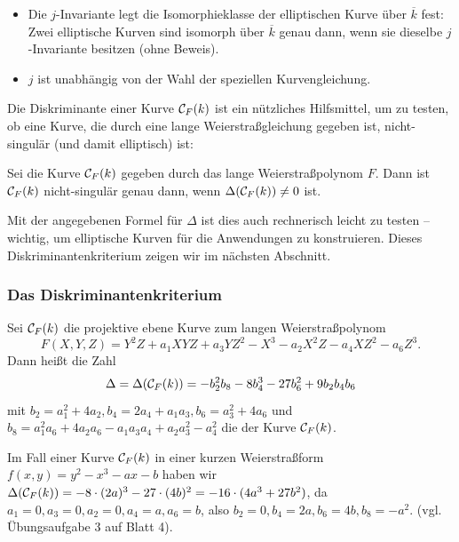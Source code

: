 \begin{bem}
	\begin{itemize}
		\item Die $j$-Invariante legt die Isomorphieklasse der elliptischen Kurve über $\overline{k}$ fest: Zwei elliptische Kurven sind isomorph über $\overline{k}$ genau dann, wenn sie dieselbe $j$-Invariante besitzen (ohne Beweis).
		\item $j$ ist unabhängig von der Wahl der speziellen Kurvengleichung.
	\end{itemize}
\end{bem}

\begin{bem}
	Die Diskriminante einer Kurve $\mathcal{C}_F(k)$ ist ein nützliches Hilfsmittel, um zu testen, ob eine Kurve, die durch eine lange Weierstraßgleichung gegeben ist, nicht-singulär (und damit elliptisch) ist:
\end{bem}

\begin{satz}
	Sei die Kurve $\mathcal{C}_F(k)$ gegeben durch das lange Weierstraßpolynom $F$. 
	Dann ist $\mathcal{C}_F(k)$ nicht-singulär genau dann, wenn $\Delta(\mathcal{C}_F(k)) \neq 0$ ist.
\end{satz}

Mit der angegebenen Formel für $\Delta$ ist dies auch rechnerisch leicht zu testen -- wichtig, um elliptische Kurven für die Anwendungen zu konstruieren. 
Dieses Diskriminantenkriterium zeigen wir im nächsten Abschnitt.
\nextlecture
\subsubsection{Das Diskriminantenkriterium}
\begin{defn}[Diskriminante]
	Sei $\mathcal{C}_F(k)$ die projektive ebene Kurve zum langen Weierstraßpolynom \marginnote{[12]}
	\[ 
	F(X,Y,Z) = Y^2Z + a_1XYZ + a_3YZ^2 - X^3 - a_2X^2Z - a_4 XZ^2 - a_6Z^3. 
	\]
	Dann heißt die Zahl
	\[ 
	\Delta = \Delta(\mathcal{C}_F(k)) = -b_2^2 b_8 - 8b_4^3 - 27b_6^2 + 9b_2b_4b_6
	\]
	mit $b_2 = a_1^2 + 4a_2, b_4 = 2a_4+a_1a_3, b_6 = a_3^2+4a_6$ und $b_8 = a_1^2 a_6 + 4a_2a_6-a_1a_3a_4 + a_2a_3^2 - a_4^2$ die  der Kurve $\mathcal{C}_F(k)$.
\end{defn}

\begin{bem}
	Im Fall einer Kurve $\mathcal{C}_F(k)$ in einer kurzen Weierstraßform $f(x,y) = y^2-x^3-ax-b$ haben wir $\Delta(\mathcal{C}_F(k)) = -8 \cdot (2a)^3 - 27 \cdot (4b)^2 = -16 \cdot (4a^3 + 27b^2)$, da $a_1 = 0, a_3 = 0, a_2 = 0, a_4 = a, a_6 = b$, also $b_2 = 0, b_4 = 2a, b_6 = 4b, b_8 = -a^2$. 
	(vgl. Übungsaufgabe 3 auf Blatt 4).
\end{bem}

